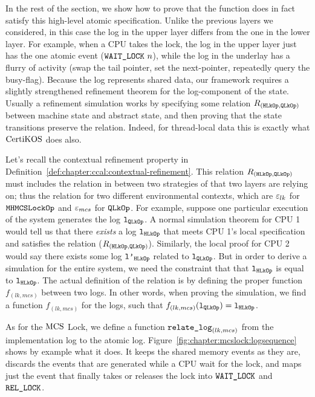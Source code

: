 In the rest of the section, we show how to prove that the function
does in fact satisfy this high-level atomic specification.
Unlike the previous layers we considered, in this case the log in the
upper layer differs from the one in the lower layer. For example, when
a CPU takes the lock, the log in the upper layer just has the one
atomic event (${\mathrm{\texttt{WAIT\_LOCK}}}~{n}$), while the log in the underlay
has a flurry of activity (swap the tail pointer, set the next-pointer,
repeatedly query the busy-flag).
Because the log represents shared data, our framework requires a
slightly strengthened refinement theorem for the log-component of the
state. Usually a refinement simulation works by specifying some
relation $R_{({\mathrm{\texttt{HLkOp}}}, {\mathrm{\texttt{QLkOp}}})}$ between machine state and abstract state, and then
proving that the state transitions preserve the relation. Indeed, for
thread-local data this is exactly what $\mathrm{CertiKOS}$ does also.

Let's recall the contextual refinement property in Definition~\ref{def:chapter:ccal:contextual-refinement}. 
This relation   $R_{({\mathrm{\texttt{HLkOp}}}, {\mathrm{\texttt{QLkOp}}})}$ must includes the relation in between 
two strategies of that two layers are relying on; 
thus the relation for two different environmental contexts, which are ${\varepsilon}_{lk}$ for ${\mathrm{\texttt{MHMCSLockOp}}}$ and ${\varepsilon}_{mcs}$ for ${\mathrm{\texttt{QLkOp}}}$.
For example, suppose one particular
execution of the system generates the log ${\mathrm{\texttt{l}}}_{{\mathrm{\texttt{QLkOp}}}}$.  A normal simulation
theorem for CPU 1 would tell us that there \emph{exists} a log ${\mathrm{\texttt{l}}}_{{\mathrm{\texttt{HLkOp}}}}$
that meets CPU 1's local specification and satisfies the relation
($R_{({{\mathrm{\texttt{HLkOp}}}}, {{\mathrm{\texttt{QLkOp}}}})}$). 
Similarly, the local proof for CPU 2 would say there
exists some log ${\mathrm{\texttt{l'}}}_{{\mathrm{\texttt{HLkOp}}}}$
related to  ${\mathrm{\texttt{l}}}_{{\mathrm{\texttt{QLkOp}}}}$. 
But in order to derive a simulation for the
entire system, we need the constraint that that ${\mathrm{\texttt{l}}}_{{\mathrm{\texttt{HLkOp}}}}$  is equal to
${\mathrm{\texttt{l}}}_{{\mathrm{\texttt{HLkOp}}}}$. 
The actual definition of the relation is by defining the proper function $f_{(lk, mcs)}$ between two logs.
In other words, when proving the simulation,
we find a function $f_{(lk, mcs)}$ for the logs, such that $f_{(lk, mcs)}({\mathrm{\texttt{l}}}_{{\mathrm{\texttt{QLkOp}}}}) = {\mathrm{\texttt{l}}}_{{\mathrm{\texttt{HLkOp}}}}$.


As for the $\mathrm{MCS}$ Lock, we define a function ${\mathrm{\texttt{relate\_log}}}_{(lk, mcs)}$ from the
implementation log to the atomic log. Figure~\ref{fig:chapter:mcslock:logsequence}
shows by example what it does. It keeps the shared memory events as
they are, discards the events that are generated while a CPU wait for
the lock, and maps just the event that finally takes or releases the
lock into ${\mathrm{\texttt{WAIT\_LOCK}}}$ and ${\mathrm{\texttt{REL\_LOCK}}}$.

